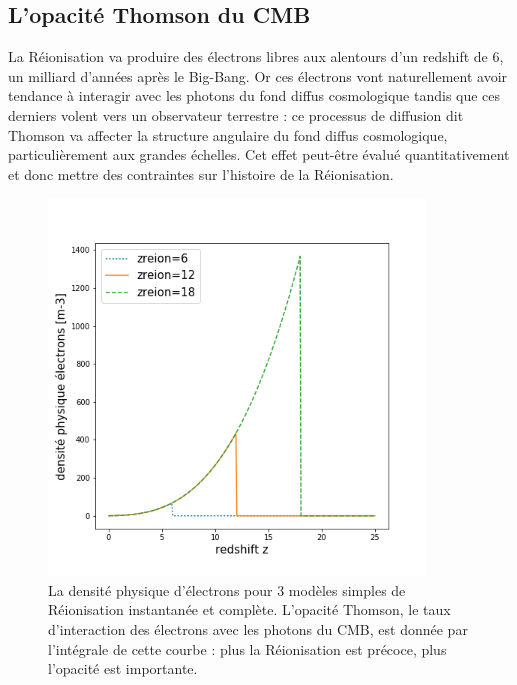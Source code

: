 \subsection{L'opacité Thomson du CMB}
La Réionisation va produire des électrons libres aux alentours d'un redshift de 6, un milliard d'années après le Big-Bang. Or ces électrons vont naturellement avoir tendance à interagir avec les photons du fond diffus cosmologique tandis que ces derniers volent vers un observateur terrestre : ce processus de diffusion dit Thomson va affecter la structure angulaire du fond diffus cosmologique, particulièrement aux grandes échelles. Cet effet peut-être évalué quantitativement et donc mettre des contraintes sur l'histoire de la Réionisation.

\begin{figure}[htbp]
	\centering
		\includegraphics[height=10cm]{figs/ne.png}
		\caption[La densité cosmique d'électrons ]{La densité physique d'électrons pour 3 modèles simples de Réionisation instantanée et complète. L'opacité Thomson, le taux d'interaction des électrons avec les photons du CMB, est donnée par l'intégrale de cette courbe : plus la Réionisation est précoce, plus l'opacité est importante.}
	\label{f:nereion}
\end{figure}

